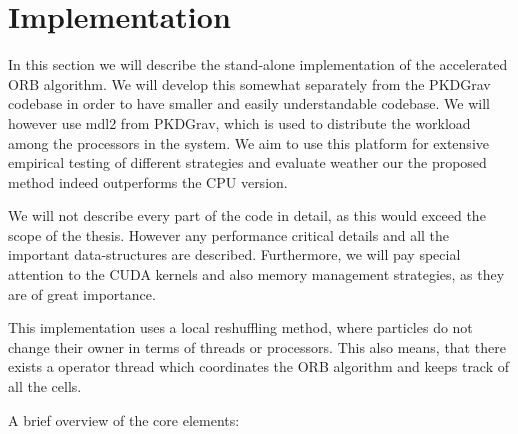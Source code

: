 \documentclass[]{article}
\begin{document}
\begin{comment}
\begin{figure}
\begin{center}
\begin{tikzpicture}
\begin{axis}[xmin = -1, xmax = 13, ymin=-1, ymax=6]
\addplot[domain = 0:12,blue] {ln(\d) / ln(2) * 
(\p * x / (900 * 6))
+  x / (50 * 6) + x /(170 * 2)};
\addplot[domain = 0:12,blue] {ln(\d * 16) / ln(2) * 
(\p * x / (900 * 6))
+  x / (50 * 6) + x /(170 * 2)};
\end{axis}
\end{tikzpicture}
\end{center}
\caption{??}
\label{fig:exectimes}
\end{figure}

\end{comment}

\newpage
\section{Implementation}

In this section we will describe the stand-alone implementation of the accelerated ORB algorithm. We will develop this somewhat separately from the PKDGrav codebase in order to have smaller and easily understandable codebase. We will however use mdl2 from PKDGrav, which is used to distribute the workload among the processors in the system. We aim to use this platform for extensive empirical testing of different strategies and evaluate weather our the proposed method indeed outperforms the CPU version. 

We will not describe every part of the code in detail, as this would exceed the scope of the thesis. However any performance critical details and all the important data-structures are described. Furthermore, we will pay special attention to the CUDA kernels and also memory management strategies, as they are of great importance.

This implementation uses a local reshuffling method, where particles do not change their owner in terms of threads or processors. This also means, that there exists a operator thread which coordinates the ORB algorithm and keeps track of all the cells.

A brief overview of the core elements:
\end{document}
